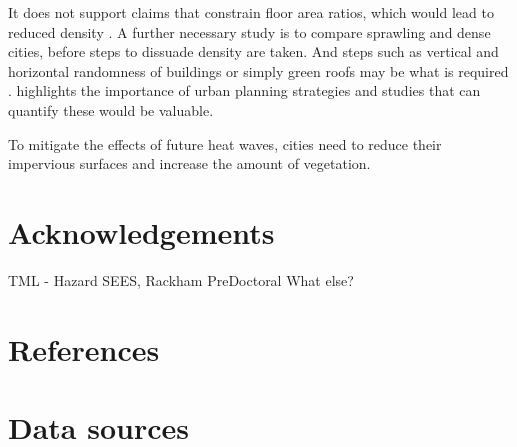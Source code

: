 \documentclass[final,3p,times,twocolumn,sort&compress]{elsarticle}
\begin{document}
It does not support claims that constrain floor area ratios, which would lead to reduced density \cite{Chun2017-mm}. 
A further necessary study is to compare sprawling and dense cities, before steps to dissuade density are taken. 
And steps such as vertical and horizontal randomness of buildings or simply green roofs may be what is required \cite{Gago2013-ta}.
highlights the importance of urban planning strategies and studies that can quantify these would be valuable.

To mitigate the effects of future heat waves, cities need to reduce their impervious surfaces and increase the amount of vegetation.


\section*{Acknowledgements}
TML - Hazard SEES, Rackham PreDoctoral
What else?


\section*{References}



\newpage
\onecolumn
\appendix

\section{Data sources}
\end{document}
